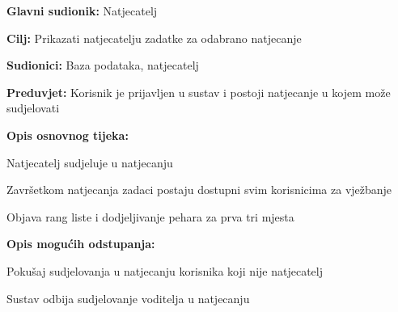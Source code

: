 					\noindent {}
					\begin{packed_item}
						
						\item \textbf{Glavni sudionik: }Natjecatelj
						\item  \textbf{Cilj:} Prikazati natjecatelju zadatke za odabrano natjecanje
						\item  \textbf{Sudionici:} Baza podataka, natjecatelj
						\item  \textbf{Preduvjet:} Korisnik je prijavljen u sustav i postoji natjecanje u kojem može sudjelovati
						\item  \textbf{Opis osnovnog tijeka:}
						
						\item[] \begin{packed_enum}
							
							\item Natjecatelj sudjeluje u natjecanju
							\item Završetkom natjecanja zadaci postaju dostupni svim korisnicima za vježbanje
							\item Objava rang liste i dodjeljivanje pehara za prva tri mjesta
							
						\end{packed_enum}
						
						\item  \textbf{Opis mogućih odstupanja:}
						
						\item[] \begin{packed_item}
							
							\item[2.a] Pokušaj sudjelovanja u natjecanju korisnika koji nije natjecatelj
							\item[] \begin{packed_enum}
								
								\item Sustav odbija sudjelovanje voditelja u natjecanju 
								
							\end{packed_enum}
						\end{packed_item}
					\end{packed_item}
					

